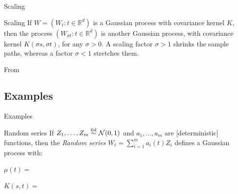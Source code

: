 \begin{frame}{Scaling}

\begin{alertblock}{Scaling}
If $W =(W_t: t \in \mathbb{R}^d)$ is a Gaussian process  with covariance kernel $K$, then the process $(W_{\sigma t}: t \in \mathbb{R}^d)$ is another Gaussian process, with covariance kernel $K(\sigma s, \sigma t)$, for any $\sigma  > 0$. A scaling factor $\sigma  > 1$ shrinks the sample paths, whereas a factor $\sigma  < 1$ stretches them.
\end{alertblock}

\pause

\begin{center}
\end{center}
\hfill From \citet{ghosal2017fundamentals}


\end{frame}


\subsection{Examples}


\begin{frame}{Examples}
\begin{exampleblock}{Random series}
	If $Z_1,\ldots,Z_m\stackrel{\mbox{\scriptsize{iid}}}{\sim} \mathcal{N}(0,1)$ and $a_1,\ldots,a_m$ are [deterministic] functions, then the \textit{Random series} $W_t = \sum_{i=1}^m a_i(t)Z_i$ defines a Gaussian process with:\bigskip
	
		\indent $\mu(t)=$\bigskip
		
		\indent $K(s, t)=$
\end{exampleblock}

\end{frame}


